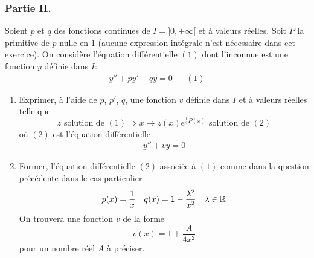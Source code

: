 \subsubsection*{Partie II.}
Soient $p$ et $q$ des fonctions continues de $I=]0,+\infty[$ et à valeurs réelles. Soit $P$ la primitive de $p$ nulle en $1$ (aucune expression intégrale n'est nécessaire dans cet exercice). On considère l'équation différentielle $(1)$ dont l'inconnue est une fonction $y$ définie dans $I$:
\begin{align*}
 y'' + py'+qy = 0 & & (1)
\end{align*}
\begin{enumerate}
 \item Exprimer, à l'aide de $p$, $p'$, $q$, une fonction $v$ définie dans $I$ et à valeurs réelles telle que
\begin{displaymath}
 z \text{ solution de } (1) \Rightarrow x\rightarrow z(x)e^{\frac{1}{2}P(x)} \text{ solution de } (2)
\end{displaymath}
où $(2)$ est l'équation différentielle
\begin{align*}
 y'' + vy= 0 
\end{align*}
\item Former, l'équation différentielle $(2)$ associée à $(1)$ comme dans la question précédente dans le cas particulier
\begin{align*}
 p(x)=\dfrac{1}{x} & & q(x)=1-\dfrac{\lambda^2}{x^2} & & \lambda\in \mathbb{R}
\end{align*}
On trouvera une fonction $v$ de la forme 
\begin{displaymath}
 v(x) = 1 + \dfrac{A}{4x^2}
\end{displaymath}
pour un nombre réel $A$ à préciser.

\end{enumerate}
